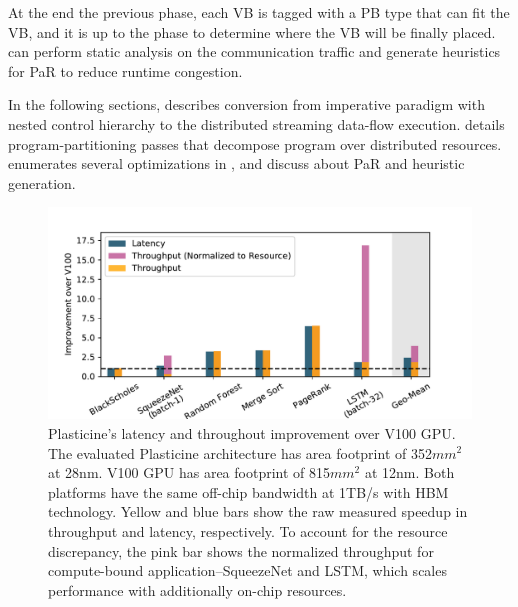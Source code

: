 At the end the previous phase, each VB is tagged with a PB type that can fit the VB, and it is up to the
 phase to determine where the VB will be finally placed.
\name can perform static analysis on the communication traffic and generate heuristics for PaR to
reduce runtime congestion.

In the following sections,  describes conversion from imperative paradigm with
nested control hierarchy to the distributed streaming data-flow execution.
 details program-partitioning passes that decompose program over distributed resources.
 enumerates several optimizations in \name, and  discuss about PaR and
heuristic generation.

\begin{figure}
\centering
\includegraphics[width=1\textwidth]{figs/slide_gpu.pdf}
\caption[Performance comparison with V100 GPU]{
  Plasticine's latency and throughout improvement over V100 GPU.
  The evaluated Plasticine architecture has area footprint of 352$mm^2$ at 28nm.
  V100 GPU has area footprint of 815$mm^2$ at 12nm.
  Both platforms have the same off-chip bandwidth at 1TB/s with HBM technology.
  Yellow and blue bars show the raw measured speedup in throughput and latency, respectively.
  To account for the resource discrepancy, the pink bar shows the normalized throughput
  for compute-bound application--SqueezeNet and LSTM, which scales performance with additionally
  on-chip resources.
}
\label{fig:peakutil}
\end{figure}

